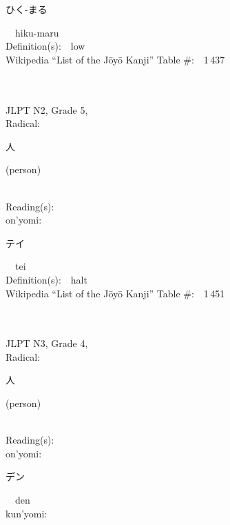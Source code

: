 \begin{multicols}{2}
{\hspace*{2em}}{\begin{CJK}{UTF8}{min} ひく-まる \end{CJK}}\ \ hiku-maru\ \ \\
Definition(s):\ \ low \\
Wikipedia ``List of the J\=oy\=o Kanji'' Table \#:\ \ 1\,437 \\
\ \ \\
{\fontsize{34pt}{40pt}  }\ \ \\  %
{JLPT N2, Grade 5, \\Radical:\ \ {\begin{CJK}{UTF8}{min} 人 \end{CJK}} (person) } \\
Reading(s):\ \ \\
{\hspace*{1em}}on'yomi:\ \ \\
{\hspace*{2em}}{\begin{CJK}{UTF8}{min} テイ \end{CJK}}\ \ tei\ \ \\
Definition(s):\ \ halt \\
Wikipedia ``List of the J\=oy\=o Kanji'' Table \#:\ \ 1\,451 \\
\ \ \\
{\fontsize{34pt}{40pt}  }\ \ \\  %
{JLPT N3, Grade 4, \\Radical:\ \ {\begin{CJK}{UTF8}{min} 人 \end{CJK}} (person) } \\
Reading(s):\ \ \\
{\hspace*{1em}}on'yomi:\ \ \\
{\hspace*{2em}}{\begin{CJK}{UTF8}{min} デン \end{CJK}}\ \ den\ \ \\
{\hspace*{1em}}kun'yomi:\ \ \\

\end{multicols}
